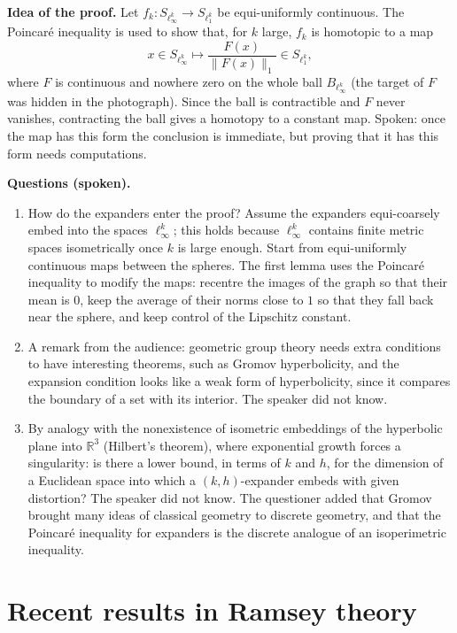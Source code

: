\medskip\noindent
{\bf Idea of the proof.} Let
$f_k : S_{\ell_\infty^k} \to S_{\ell_1^k}$ be
equi-uniformly continuous. The Poincaré
inequality is used to show that, for $k$
large, $f_k$ is homotopic to a map
$$
x \in S_{\ell_\infty^k}
\mapsto \frac{F(x)}{\|F(x)\|_1}
\in S_{\ell_1^k},
$$
where $F$ is continuous and nowhere zero on
the whole ball $B_{\ell_\infty^k}$ (the
target of $F$ was hidden in the photograph).
Since the ball is contractible and $F$ never
vanishes, contracting the ball gives a
homotopy to a constant map. Spoken: once the
map has this form the conclusion is
immediate, but proving that it has this form
needs computations.

\medskip\noindent
{\bf Questions (spoken).}
\begin{enumerate}
\item How do the expanders enter the proof?
Assume the expanders equi-coarsely embed
into the spaces $\ell_\infty^{k}$; this holds
because $\ell_\infty^k$ contains finite
metric spaces isometrically once $k$ is
large enough. Start from equi-uniformly
continuous maps between the spheres. The
first lemma uses the Poincaré inequality to
modify the maps: recentre the images of the
graph so that their mean is $0$, keep the
average of their norms close to $1$ so that
they fall back near the sphere, and keep
control of the Lipschitz constant.
\item A remark from the audience: geometric
group theory needs extra conditions to have
interesting theorems, such as Gromov
hyperbolicity, and the expansion condition
looks like a weak form of hyperbolicity,
since it compares the boundary of a set with
its interior. The speaker did not know.
\item By analogy with the nonexistence of
isometric embeddings of the hyperbolic plane
into $\mathbb{R}^3$ (Hilbert's theorem),
where exponential growth forces a
singularity: is there a lower bound, in
terms of $k$ and $h$, for the dimension of a
Euclidean space into which a
$(k,h)$-expander embeds with given
distortion? The speaker did not know. The
questioner added that Gromov brought many
ideas of classical geometry to discrete
geometry, and that the Poincaré inequality
for expanders is the discrete analogue of an
isoperimetric inequality.
\end{enumerate}



\section{Recent results in Ramsey theory}
\label{section-recent-results-ramsey}


